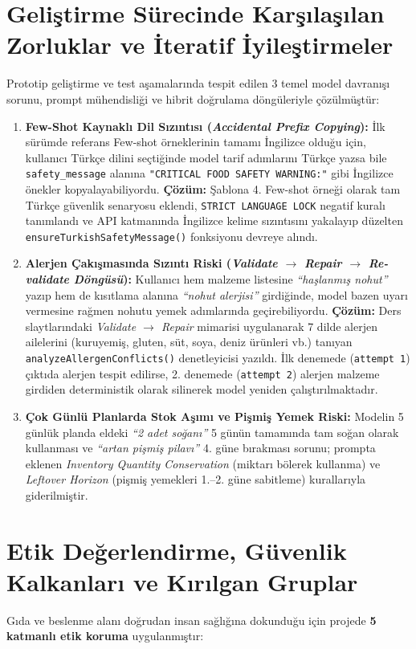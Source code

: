 \documentclass[9pt,a4paper]{article}
\begin{document}
\section{Geliştirme Sürecinde Karşılaşılan Zorluklar ve İteratif İyileştirmeler}
Prototip geliştirme ve test aşamalarında tespit edilen 3 temel model davranışı sorunu, prompt mühendisliği ve hibrit doğrulama döngüleriyle çözülmüştür:
\begin{enumerate}
  \item \textbf{Few-Shot Kaynaklı Dil Sızıntısı (\emph{Accidental Prefix Copying}):} İlk sürümde referans Few-shot örneklerinin tamamı İngilizce olduğu için, kullanıcı Türkçe dilini seçtiğinde model tarif adımlarını Türkçe yazsa bile \texttt{safety\_message} alanına \texttt{"CRITICAL FOOD SAFETY WARNING:"} gibi İngilizce önekler kopyalayabiliyordu. \textbf{Çözüm:} Şablona 4. Few-shot örneği olarak tam Türkçe güvenlik senaryosu eklendi, \texttt{STRICT LANGUAGE LOCK} negatif kuralı tanımlandı ve API katmanında İngilizce kelime sızıntısını yakalayıp düzelten \texttt{ensureTurkishSafetyMessage()} fonksiyonu devreye alındı.
  \item \textbf{Alerjen Çakışmasında Sızıntı Riski (\emph{Validate $\rightarrow$ Repair $\rightarrow$ Re-validate Döngüsü}):} Kullanıcı hem malzeme listesine \emph{``haşlanmış nohut''} yazıp hem de kısıtlama alanına \emph{``nohut alerjisi''} girdiğinde, model bazen uyarı vermesine rağmen nohutu yemek adımlarında geçirebiliyordu. \textbf{Çözüm:} Ders slaytlarındaki \emph{Validate $\rightarrow$ Repair} mimarisi uygulanarak 7 dilde alerjen ailelerini (kuruyemiş, gluten, süt, soya, deniz ürünleri vb.) tanıyan \texttt{analyzeAllergenConflicts()} denetleyicisi yazıldı. İlk denemede (\texttt{attempt 1}) çıktıda alerjen tespit edilirse, 2. denemede (\texttt{attempt 2}) alerjen malzeme girdiden deterministik olarak silinerek model yeniden çalıştırılmaktadır.
  \item \textbf{Çok Günlü Planlarda Stok Aşımı ve Pişmiş Yemek Riski:} Modelin 5 günlük planda eldeki \emph{``2 adet soğanı''} 5 günün tamamında tam soğan olarak kullanması ve \emph{``artan pişmiş pilavı''} 4. güne bırakması sorunu; prompta eklenen \emph{Inventory Quantity Conservation} (miktarı bölerek kullanma) ve \emph{Leftover Horizon} (pişmiş yemekleri 1.--2. güne sabitleme) kurallarıyla giderilmiştir.
\end{enumerate}

\section{Etik Değerlendirme, Güvenlik Kalkanları ve Kırılgan Gruplar}
Gıda ve beslenme alanı doğrudan insan sağlığına dokunduğu için projede \textbf{5 katmanlı etik koruma} uygulanmıştır:
\end{document}
